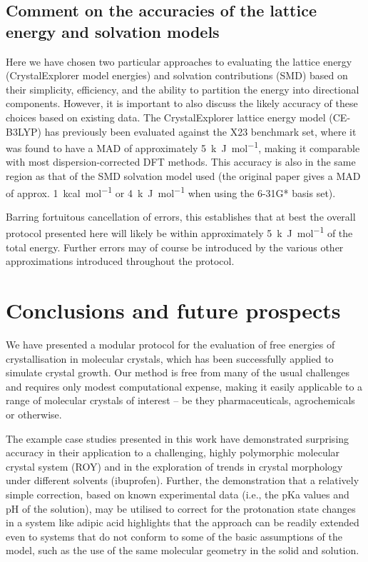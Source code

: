\documentclass[twoside,twocolumn,9pt]{article}
\begin{document}
\subsection{Comment on the accuracies of the lattice energy and solvation models}
Here we have chosen two particular approaches to evaluating the lattice energy (CrystalExplorer model energies) and solvation contributions (SMD) based on their simplicity, efficiency, and the ability to partition the energy into directional components. However, it is important to also discuss the likely accuracy of these choices based on existing data. The CrystalExplorer lattice energy model (CE-B3LYP) has previously been evaluated against the X23 benchmark set, where it was found to have a MAD of approximately \qty{5}{k.J.mol^{-1}}, making it comparable with most dispersion-corrected DFT methods. This accuracy is also in the same region as that of the SMD solvation model used (the original paper gives a MAD of approx. \qty{1}{kcal.mol^{-1}} or \qty{4}{k.J.mol^{-1}} when using the 6-31G* basis set).

Barring fortuitous cancellation of errors, this establishes that at best the overall protocol presented here will likely be within approximately \qty{5}{k.J.mol^{-1}} of the total energy. Further errors may of course be introduced by the various other approximations introduced throughout the protocol.


\section{Conclusions and future prospects}
We have presented a modular protocol for the evaluation of free energies of crystallisation in molecular crystals, which has been successfully applied to simulate crystal growth. Our method is free from many of the usual challenges and requires only modest computational expense, making it easily applicable to a range of molecular crystals of interest -- be they pharmaceuticals, agrochemicals or otherwise. 

The example case studies presented in this work have demonstrated surprising accuracy in their application to a challenging, highly polymorphic molecular crystal system (ROY) and in the exploration of trends in crystal morphology under different solvents (ibuprofen).
Further, the demonstration that a relatively simple correction, based on known experimental data (i.e., the pKa values and pH of the solution), may be utilised to correct for the protonation state changes in a system like adipic acid highlights that the approach can be readily extended even to systems that do not conform to some of the basic assumptions of the model, such as the use of the same molecular geometry in the solid and solution.
\end{document}
